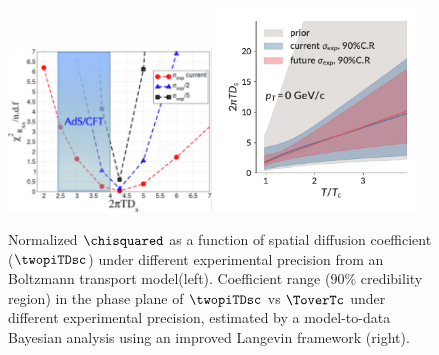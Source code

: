 \begin{figure}[ht]
	\begin{center}
		\includegraphics[width=0.48\textwidth]{hf/figures/Greco.pdf}
		\includegraphics[width=0.48\textwidth]{hf/figures/Plot_posterior_D2piT_calibrate_on_Duke-central_p0.pdf}
		\caption{Normalized $\chisquared$ as a function of spatial diffusion coefficient ($\twopiTDsc$) under different experimental precision from an Boltzmann transport model(left). Coefficient range (90\% credibility region) in the phase plane of $\twopiTDsc$ vs $\ToverTc$ under different experimental precision, estimated by a model-to-data Bayesian analysis using an improved Langevin framework (right).}
		\label{fig:RAAv2.Dstheory}
	\end{center}
\end{figure}

